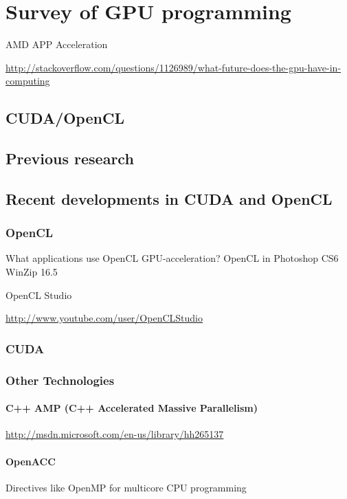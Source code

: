 \chapter{Survey of GPU programming}

AMD APP Acceleration 


\hyperref[AMD]{http://stackoverflow.com/questions/1126989/what-future-does-the-gpu-have-in-computing}


\section{CUDA/OpenCL}

\section{Previous research}



\section{Recent developments in CUDA and OpenCL}
\subsection{OpenCL}

What applications use OpenCL GPU-acceleration?
OpenCL in Photoshop CS6
WinZip 16.5

OpenCL Studio

\hyperref[OpenCLStudio]{http://www.youtube.com/user/OpenCLStudio}

\subsection{CUDA}

\subsection{Other Technologies}
\subsubsection{C++ AMP (C++ Accelerated Massive Parallelism)}

\hyperref[C++ AMP MSDN]{http://msdn.microsoft.com/en-us/library/hh265137}

\subsubsection{OpenACC}
Directives like OpenMP for multicore CPU programming

